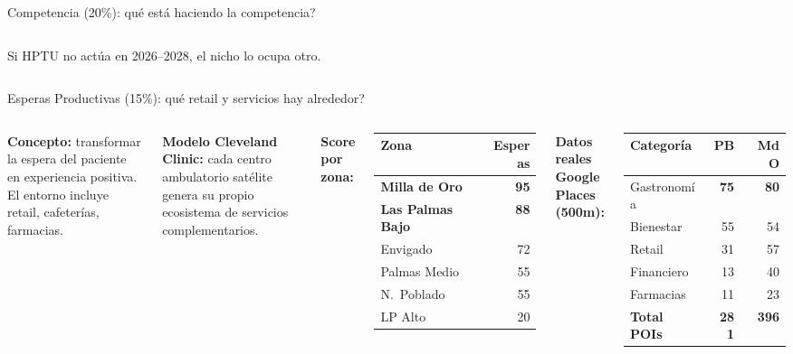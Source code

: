 \documentclass[aspectratio=169, 11pt]{beamer}
\begin{document}
\begin{frame}{\textcolor{comp}{Competencia (20\%)}: \textquestiondown qu\'{e} est\'{a} haciendo la competencia?}
\begin{columns}[T]
\vspace{1pt}
{\scriptsize\textcolor{comp}{Si HPTU no act\'{u}a en 2026--2028, el nicho lo ocupa otro.}}
\end{columns}
\end{frame}

\begin{frame}{\textcolor{esp}{Esperas Productivas (15\%)}: \textquestiondown qu\'{e} retail y servicios hay alrededor?}

\begin{columns}[T]
\vspace{2pt}
{\scriptsize\textbf{Concepto:} transformar la espera del paciente en experiencia positiva. El entorno incluye retail, cafeter\'{i}as, farmacias.}

\vspace{3pt}
{\scriptsize\textbf{Modelo Cleveland Clinic:} cada centro ambulatorio sat\'{e}lite genera su propio ecosistema de servicios complementarios.}

\vspace{3pt}
{\scriptsize\textbf{Score por zona:}}
\vspace{2pt}

{\scriptsize
\begin{tabular}{@{}lr@{}}
\toprule
\textbf{Zona} & \textcolor{esp}{\textbf{Esperas}} \\
\midrule
\rowcolor{esp!8}
\textbf{Milla de Oro} & \textcolor{esp}{\textbf{95}} \\
\textbf{Las Palmas Bajo} & \textcolor{esp}{\textbf{88}} \\
Envigado & 72 \\
Palmas Medio & 55 \\
N.\ Poblado & 55 \\
LP Alto & 20 \\
\bottomrule
\end{tabular}
}

\vspace{2pt}
{\scriptsize\textbf{Datos reales Google Places (500m):}}
\vspace{2pt}

{\tiny
\begin{tabular}{@{}l r r@{}}
\toprule
\textbf{Categor\'{i}a} & \textbf{PB} & \textbf{MdO} \\
\midrule
\rowcolor{esp!8}
Gastronom\'{i}a & \textbf{75} & \textbf{80} \\
Bienestar & 55 & 54 \\
Retail & 31 & 57 \\
Financiero & 13 & 40 \\
Farmacias & 11 & 23 \\
\midrule
\textbf{Total POIs} & \textcolor{esp}{\textbf{281}} & \textcolor{esp}{\textbf{396}} \\
\bottomrule
\end{tabular}
}


\end{columns}
\end{frame}
\end{document}
